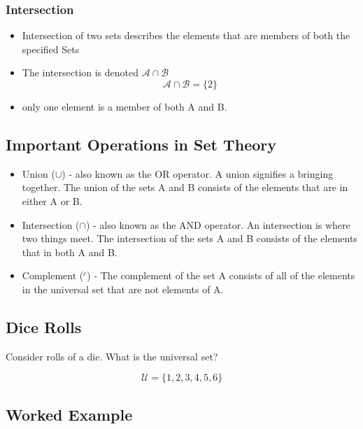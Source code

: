 \documentclass[12pt]{article}
\begin{document}



\subsubsection*{Intersection}
\begin{itemize}

\item Intersection of two sets describes the elements that are members of both the specified Sets

\item The intersection is denoted $\mathcal{A\cap B}$ 
\[ \mathcal{A\cap B} = \{2\}\]

\item only one element is a member of both A and B.
\end{itemize}



\subsection{Important Operations in Set Theory}

\begin{itemize}
\item Union ($\cup$) - also known as the OR operator. A union signifies a bringing together. The union of the sets A and B consists of the elements that are in either A or B.
\item Intersection ($\cap$) - also known as the AND operator. An intersection is where two things meet. The intersection of the sets A and B consists of the elements that in both A and B.
\item Complement ($^{c}$) - The complement of the set A consists of all of the elements in the universal set that are not elements of A.
\end{itemize}

\subsection*{Dice Rolls}
Consider rolls of a die. What is the universal set?

\[ \mathcal{U} = \{1,2,3,4,5,6\} \]

\subsection*{Worked Example}
\end{document}
